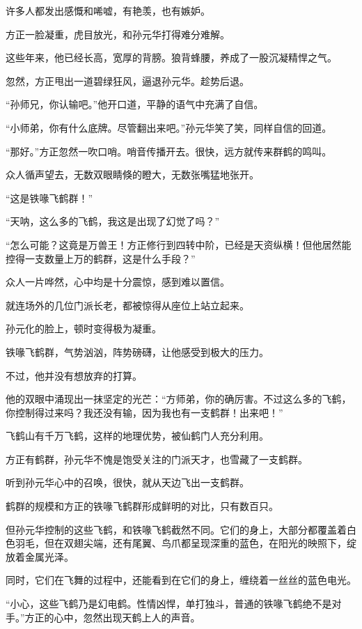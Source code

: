 \begin{this_body}
许多人都发出感慨和唏嘘，有艳羡，也有嫉妒。

方正一脸凝重，虎目放光，和孙元华打得难分难解。

这些年来，他已经长高，宽厚的背膀。狼背蜂腰，养成了一股沉凝精悍之气。

忽然，方正甩出一道碧绿狂风，逼退孙元华。趁势后退。

“孙师兄，你认输吧。”他开口道，平静的语气中充满了自信。

“小师弟，你有什么底牌。尽管翻出来吧。”孙元华笑了笑，同样自信的回道。

“那好。”方正忽然一吹口哨。哨音传播开去。很快，远方就传来群鹤的鸣叫。

众人循声望去，无数双眼睛倏的瞪大，无数张嘴猛地张开。

“这是铁喙飞鹤群！”

“天呐，这么多的飞鹤，我这是出现了幻觉了吗？”

“怎么可能？这竟是万兽王！方正修行到四转中阶，已经是天资纵横！但他居然能控得一支数量上万的鹤群，这是什么手段？”

众人一片哗然，心中均是十分震惊，感到难以置信。

就连场外的几位门派长老，都被惊得从座位上站立起来。

孙元化的脸上，顿时变得极为凝重。

铁喙飞鹤群，气势汹汹，阵势磅礴，让他感受到极大的压力。

不过，他并没有想放弃的打算。

他的双眼中涌现出一抹坚定的光芒：“方师弟，你的确厉害。不过这么多的飞鹤，你控制得过来吗？我还没有输，因为我也有一支鹤群！出来吧！”

飞鹤山有千万飞鹤，这样的地理优势，被仙鹤门人充分利用。

方正有鹤群，孙元华不愧是饱受关注的门派天才，也雪藏了一支鹤群。

听到孙元华心中的召唤，很快，就从天边飞出一支鹤群。

鹤群的规模和方正的铁喙飞鹤群形成鲜明的对比，只有数百只。

但孙元华控制的这些飞鹤，和铁喙飞鹤截然不同。它们的身上，大部分都覆盖着白色羽毛，但在双翅尖端，还有尾翼、鸟爪都呈现深重的蓝色，在阳光的映照下，绽放着金属光泽。

同时，它们在飞舞的过程中，还能看到在它们的身上，缠绕着一丝丝的蓝色电光。

“小心，这些飞鹤乃是幻电鹤。性情凶悍，单打独斗，普通的铁喙飞鹤绝不是对手。”方正的心中，忽然出现天鹤上人的声音。


\end{this_body}
